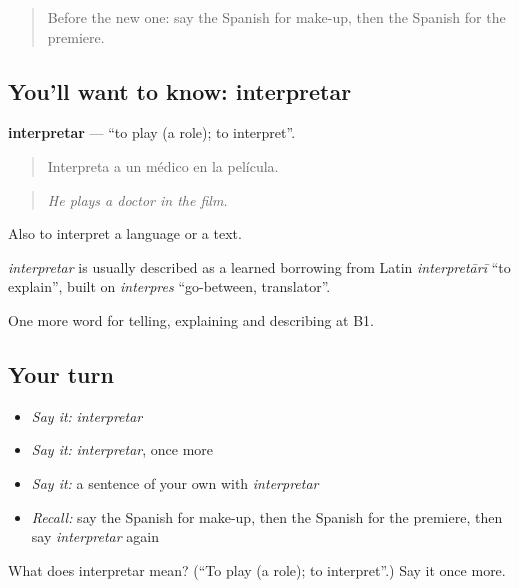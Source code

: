 \label{lesson:ES-C760-interpretar}



\begin{quote}
Before the new one: say the Spanish for make-up, then the Spanish for the premiere.
\end{quote}

\subsection*{You'll want to know: interpretar}
\textbf{interpretar} — \textquotedblleft{}to play (a role); to interpret\textquotedblright{}.

\begin{quote}
Interpreta a un médico en la película.
\end{quote}

\begin{quote}
\emph{He plays a doctor in the film.}
\end{quote}

Also to interpret a language or a text.

\begin{cousinweb}
\emph{interpretar} is usually described as a learned borrowing from Latin \emph{interpretārī} \textquotedblleft{}to explain\textquotedblright{}, built on \emph{interpres} \textquotedblleft{}go-between, translator\textquotedblright{}.
\end{cousinweb}

\begin{grammarlens}[title={What you've built}]
One more word for telling, explaining and describing at B1.
\end{grammarlens}

\subsection*{Your turn}
\begin{itemize}
\raggedright
  \item \emph{Say it:} \emph{interpretar}
  \item \emph{Say it:} \emph{interpretar}, once more
  \item \emph{Say it:} a sentence of your own with \emph{interpretar}
  \item \emph{Recall:} say the Spanish for make-up, then the Spanish for the premiere, then say \emph{interpretar} again
\end{itemize}

\begin{tcolorbox}[breakable,colback=teal!4,colframe=teal!35!black,title={Before you move on}]
What does interpretar mean? (\textquotedblleft{}To play (a role); to interpret\textquotedblright{}.) Say it once more.
\end{tcolorbox}
